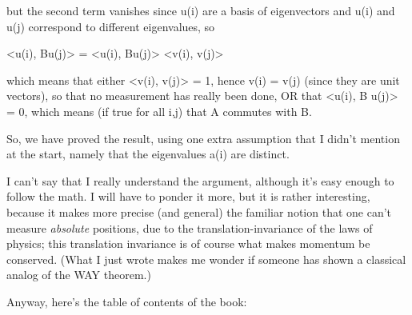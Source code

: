 but the second term vanishes since u(i) are a basis of eigenvectors
and u(i) and u(j) correspond to different eigenvalues, so

<u(i), Bu(j)> = <u(i), Bu(j)> <v(i), v(j)>

which means that either <v(i), v(j)> = 1, hence v(i) = v(j)
(since they are unit vectors), so that no measurement has
really been done, OR that <u(i), B u(j)> = 0, which means (if true for
all i,j) that A commutes with B.

So, we have proved the result, using one extra assumption that I didn't
mention at the start, namely that the eigenvalues a(i) are distinct.  

I can't say that I really understand the argument, although it's easy
enough to follow the math.  I will have to ponder it more, but it is
rather interesting, because it makes more precise (and general) the familiar
notion that one can't measure \emph{absolute} positions, due to the
translation-invariance of the laws of physics; this translation
invariance is of course what makes momentum be conserved.  (What I just
wrote makes me wonder if someone has shown a classical analog of the WAY
theorem.)

Anyway, here's the table of contents of the book:


